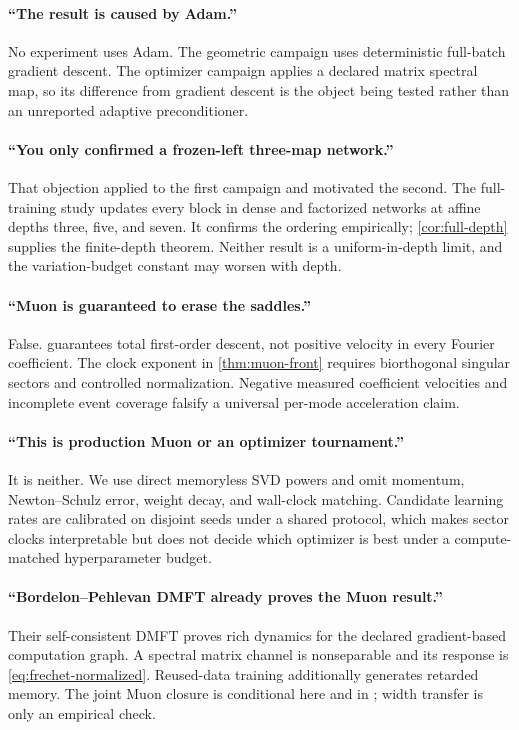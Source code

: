 \documentclass[11pt]{article}
\newcommand{\1}{\mathbf 1}
\theoremstyle{plain}
\theoremstyle{definition}
\begin{document}
\paragraph{``The result is caused by Adam.''}
No experiment uses Adam.  The geometric campaign uses deterministic
full-batch gradient descent.  The optimizer campaign applies a declared
matrix spectral map, so its difference from gradient descent is the object
being tested rather than an unreported adaptive preconditioner.

\paragraph{``You only confirmed a frozen-left three-map network.''}
That objection applied to the first campaign and motivated the second.  The
full-training study updates every block in dense and factorized networks at
affine depths three, five, and seven.  It confirms the ordering empirically;
\cref{cor:full-depth} supplies the finite-depth theorem.  Neither result is
a uniform-in-depth limit, and the variation-budget constant may worsen with
depth.

\paragraph{``Muon is guaranteed to erase the saddles.''}
False.   guarantees total first-order descent, not
positive velocity in every Fourier coefficient.  The clock exponent in
\cref{thm:muon-front} requires biorthogonal singular sectors and controlled
normalization.  Negative measured coefficient velocities and incomplete
event coverage falsify a universal per-mode acceleration claim.

\paragraph{``This is production Muon or an optimizer tournament.''}
It is neither.  We use direct memoryless SVD powers and omit momentum,
Newton--Schulz error, weight decay, and wall-clock matching.  Candidate
learning rates are calibrated on disjoint seeds under a shared protocol,
which makes sector clocks interpretable but does not decide which optimizer
is best under a compute-matched hyperparameter budget.

\paragraph{``Bordelon--Pehlevan DMFT already proves the Muon result.''}
Their self-consistent DMFT proves rich dynamics for the declared
gradient-based computation graph.  A spectral matrix channel is
nonseparable and its response is \eqref{eq:frechet-normalized}.  Reused-data
training additionally generates retarded memory.  The joint Muon closure is
conditional here and in \citet{aiad2026sequential}; width transfer is only an
empirical check.
\end{document}
